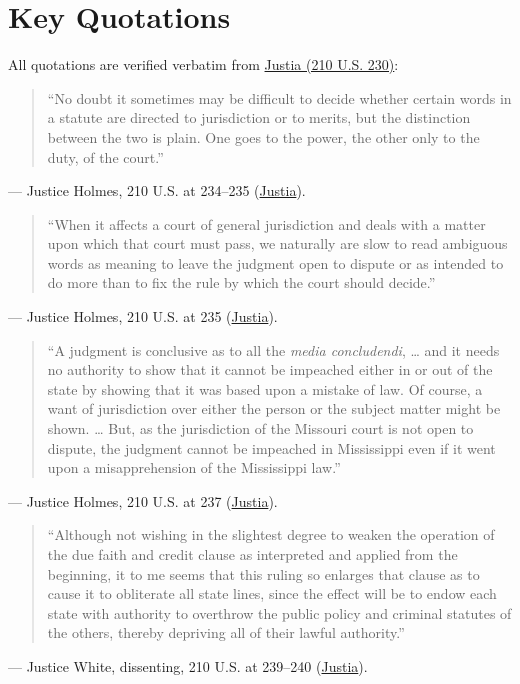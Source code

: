 \documentclass[12pt]{article}
\begin{document}
\section{Key Quotations}
All quotations are verified verbatim from \href{https://supreme.justia.com/cases/federal/us/210/230/}{Justia (210 U.S. 230)}:

\begin{quote}
``No doubt it sometimes may be difficult to decide whether certain words in a statute are directed to jurisdiction or to merits, but the distinction between the two is plain. One goes to the power, the other only to the duty, of the court.''
\end{quote}
\noindent --- Justice Holmes, 210 U.S. at 234--235 (\href{https://supreme.justia.com/cases/federal/us/210/230/}{Justia}).

\begin{quote}
``When it affects a court of general jurisdiction and deals with a matter upon which that court must pass, we naturally are slow to read ambiguous words as meaning to leave the judgment open to dispute or as intended to do more than to fix the rule by which the court should decide.''
\end{quote}
\noindent --- Justice Holmes, 210 U.S. at 235 (\href{https://supreme.justia.com/cases/federal/us/210/230/}{Justia}).

\begin{quote}
``A judgment is conclusive as to all the \textit{media concludendi}, \ldots{} and it needs no authority to show that it cannot be impeached either in or out of the state by showing that it was based upon a mistake of law. Of course, a want of jurisdiction over either the person or the subject matter might be shown. \ldots{} But, as the jurisdiction of the Missouri court is not open to dispute, the judgment cannot be impeached in Mississippi even if it went upon a misapprehension of the Mississippi law.''
\end{quote}
\noindent --- Justice Holmes, 210 U.S. at 237 (\href{https://supreme.justia.com/cases/federal/us/210/230/}{Justia}).

\begin{quote}
``Although not wishing in the slightest degree to weaken the operation of the due faith and credit clause as interpreted and applied from the beginning, it to me seems that this ruling so enlarges that clause as to cause it to obliterate all state lines, since the effect will be to endow each state with authority to overthrow the public policy and criminal statutes of the others, thereby depriving all of their lawful authority.''
\end{quote}
\noindent --- Justice White, dissenting, 210 U.S. at 239--240 (\href{https://supreme.justia.com/cases/federal/us/210/230/}{Justia}).
\end{document}
